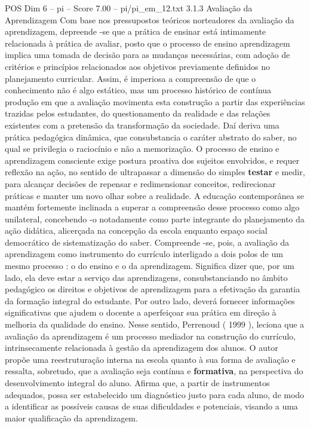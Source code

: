 \begin{textsample}{POS Dim 6 – pi – Score 7.00 – pi/pi\_em\_12.txt}  \label{ex:f6_pos_194}
3.1.3 Avaliação da Aprendizagem Com base nos pressupostos teóricos norteadores da avaliação da aprendizagem, depreende -se que a prática de ensinar está intimamente relacionada à prática de avaliar, posto que o processo de ensino aprendizagem implica uma tomada de decisão para as mudanças necessárias, com adoção de critérios e princípios relacionados aos objetivos previamente definidos no planejamento curricular.
Assim, é imperiosa a compreensão de que o conhecimento não é algo estático, mas um processo histórico de contínua produção em que a avaliação movimenta esta construção a partir das experiências trazidas pelos estudantes, do questionamento da realidade e das relações existentes com a pretensão da transformação da sociedade.
Daí deriva uma prática pedagógica dinâmica, que consubstancia o caráter abstrato do saber, no qual se privilegia o raciocínio e não a memorização.
O processo de ensino e aprendizagem consciente exige postura proativa dos sujeitos envolvidos, e requer reflexão na ação, no sentido de ultrapassar a dimensão do simples \textbf{testar} e medir, para alcançar decisões de repensar e redimensionar conceitos, redirecionar práticas e manter um novo olhar sobre a realidade.
A educação contemporânea se mantém fortemente inclinada a superar a compreensão desse processo como algo unilateral, concebendo -o notadamente como parte integrante do planejamento da ação didática, alicerçada na concepção da escola enquanto espaço social democrático de sistematização do saber.
Compreende -se, pois, a avaliação da aprendizagem como instrumento do currículo interligado a dois polos de um mesmo processo : o do ensino e o da aprendizagem.
Significa dizer que, por um lado, ela deve estar a serviço das aprendizagens, consubstanciando no âmbito pedagógico os direitos e objetivos de aprendizagem para a efetivação da garantia da formação integral do estudante.
Por outro lado, deverá fornecer informações significativas que ajudem o docente a aperfeiçoar sua prática em direção à melhoria da qualidade do ensino.
Nesse sentido, Perrenoud ( 1999 ), leciona que a avaliação da aprendizagem é um processo mediador na construção do currículo, intrinsecamente relacionada à gestão da aprendizagem dos alunos.
O autor propõe uma reestruturação interna na escola quanto à sua forma de avaliação e ressalta, sobretudo, que a avaliação seja contínua e \textbf{formativa}, na perspectiva do desenvolvimento integral do aluno.
Afirma que, a partir de instrumentos adequados, possa ser estabelecido um diagnóstico justo para cada aluno, de modo a identificar as possíveis causas de suas dificuldades e potenciais, visando a uma maior qualificação da aprendizagem.

\end{textsample}

